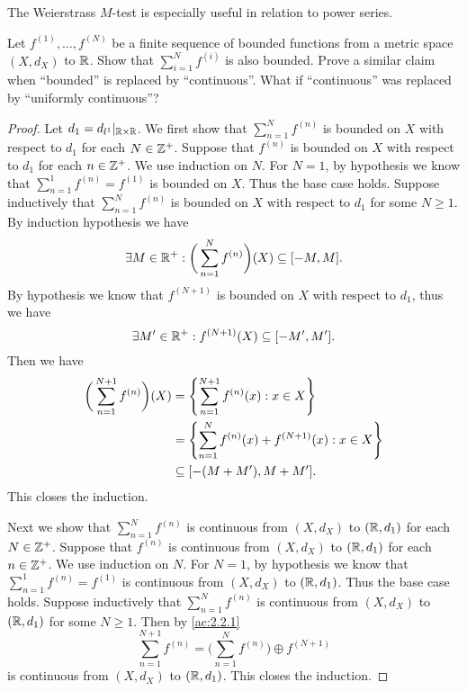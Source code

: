 \begin{note}
  The Weierstrass \(M\)-test is especially useful in relation to power series.
\end{note}

\exercisesection

\begin{ex}\label{ex:3.5.1}
  Let \(f^{(1)}, \dots, f^{(N)}\) be a finite sequence of bounded functions from a metric space \((X, d_X)\) to \(\mathbb{R}\).
  Show that \(\sum_{i = 1}^N f^{(i)}\) is also bounded.
  Prove a similar claim when ``bounded'' is replaced by ``continuous''.
  What if ``continuous'' was replaced by ``uniformly continuous''?
\end{ex}

\begin{proof}
  Let \(d_1 = d_{l^1}|_{\mathbb{R} \times \mathbb{R}}\).
  We first show that \(\sum_{n = 1}^N f^{(n)}\) is bounded on \(X\) with respect to \(d_1\) for each \(N \in \mathbb{Z}^+\).
  Suppose that \(f^{(n)}\) is bounded on \(X\) with respect to \(d_1\) for each \(n \in \mathbb{Z}^+\).
  We use induction on \(N\).
  For \(N = 1\), by hypothesis we know that \(\sum_{n = 1}^1 f^{(n)} = f^{(1)}\) is bounded on \(X\).
  Thus the base case holds.
  Suppose inductively that \(\sum_{n = 1}^N f^{(n)}\) is bounded on \(X\) with respect to \(d_1\) for some \(N \geq 1\).
  By induction hypothesis we have
  \[
    \exists M \in \mathbb{R}^+ : \bigg(\sum_{n = 1}^N f^{(n)}\bigg)(X) \subseteq [-M, M].
  \]
  By hypothesis we know that \(f^{(N + 1)}\) is bounded on \(X\) with respect to \(d_1\), thus we have
  \[
    \exists M' \in \mathbb{R}^+ : f^{(N + 1)}(X) \subseteq [-M', M'].
  \]
  Then we have
  \begin{align*}
    \bigg(\sum_{n = 1}^{N + 1} f^{(n)}\bigg)(X) & = \left\lbrace\sum_{n = 1}^{N + 1} f^{(n)}(x) : x \in X\right\rbrace            \\
                                                & = \left\lbrace\sum_{n = 1}^N f^{(n)}(x) + f^{(N + 1)}(x) : x \in X\right\rbrace \\
                                                & \subseteq [-(M + M'), M + M'].
  \end{align*}
  This closes the induction.

  Next we show that \(\sum_{n = 1}^N f^{(n)}\) is continuous from \((X, d_X)\) to \((\mathbb{R}, d_1)\) for each \(N \in \mathbb{Z}^+\).
  Suppose that \(f^{(n)}\) is continuous from \((X, d_X)\) to \((\mathbb{R}, d_1)\) for each \(n \in \mathbb{Z}^+\).
  We use induction on \(N\).
  For \(N = 1\), by hypothesis we know that \(\sum_{n = 1}^1 f^{(n)} = f^{(1)}\) is continuous from \((X, d_X)\) to \((\mathbb{R}, d_1)\).
  Thus the base case holds.
  Suppose inductively that \(\sum_{n = 1}^N f^{(n)}\) is continuous from \((X, d_X)\) to \((\mathbb{R}, d_1)\) for some \(N \geq 1\).
  Then by \cref{ac:2.2.1}
  \[
    \sum_{n = 1}^{N + 1} f^{(n)} = \bigg(\sum_{n = 1}^N f^{(n)}\bigg) \oplus f^{(N + 1)}
  \]
  is continuous from \((X, d_X)\) to \((\mathbb{R}, d_1)\).
  This closes the induction.


\end{proof}
